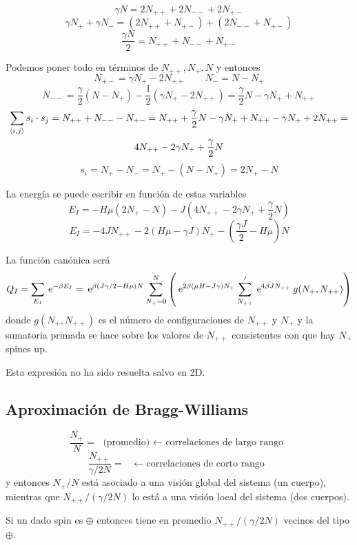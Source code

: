 \documentclass[10pt,oneside]{CBFT_book}
\begin{document}
\[
	\gamma N = 2N_{++} + 2N_{--} + 2N_{+-}
\]
\[
	\gamma N_+ + \gamma N_- = (2N_{++} + N_{+-}) + (2N_{--} + N_{+-})
\]
\[
	\frac{\gamma N}{2} = N_{++} + N_{--} + N_{+-} 
\]

Podemos poner todo en términos de $N_{++}, N_+, N$ y entonces
\[
	N_{+-} = \gamma N_+ - 2N_{++} \qquad N_- = N - N_+
\]
\[
	N_{--} = \frac{\gamma}{2}(N-N_+) - \frac{1}{2}(\gamma N_+ - 2N_{++}) =
	\frac{\gamma}{2} N - \gamma N_+ + N_{++}
\]
\begin{multline*}
	\sum_{\braket{i,j}} s_i \cdot s_j = N_{++} + N_{--} - N_{+-} =
	N_{++} + \frac{\gamma}{2}N - \gamma N_+ + N_{++} - \gamma N_+ + 2N_{++}= \\
	4N_{++} - 2\gamma N_+ + \frac{\gamma}{2}N 
\end{multline*}
\[
	s_i = N_+ - N_- = N_+ - (N-N_+) = 2N_+ - N
\]

La energía se puede escribir en función de estas variables
\[
	E_I = - H\mu (2N_+ - N) - J(4N_{++} - 2\gamma N_+ + \frac{\gamma}{2}N)
\]
\[
	E_I = -4JN_{++} - 2(H\mu - \gamma J)N_+ - \left( \frac{\gamma J}{2}- H\mu \right)N
\]


La función canónica será
\[
	Q_I = \sum_{E_I} \:\mathrm{e}^{-\beta E_I} = \:\mathrm{e}^{\beta(J\gamma/2 - H\mu)N } \sum_{N_+=0}^N
	\left( \:\mathrm{e}^{2\beta( \mu H - J\gamma )N_+ } \sum_{N_{++}}' \:\mathrm{e}^{4\beta J N_{++}}
	\: g(N_+,N_{++})\right)
\]
donde $g(N_+,N_{++})$ es el número de configuraciones de $N_{++}$ y $N_{+}$ y la sumatoria primada se hace 
sobre los valores de $N_{++}$ consistentes con que hay $N_{+}$ spines up.

Esta expresión no ha sido resuelta salvo en 2D.

\subsection{Aproximación de Bragg-Williams}

\[
	\frac{N_+}{N} = \text{ (promedio) $\leftarrow$ correlaciones de largo rango } 
\]
\[
	\frac{N_{++}}{\gamma/2 N} = \text{  $\leftarrow$ correlaciones de corto rango } 
\]
y entonces $N_{+}/N$ está asociado a una visión global del sistema (un cuerpo), 
mientras que $N_{++}/(\gamma/2 N)$ lo está a una visión local del sistema (dos cuerpos).

Si un dado spin es $\oplus$ entonces tiene en promedio $N_{++}/(\gamma/2 N)$ vecinos del tipo $\oplus$.
\end{document}
